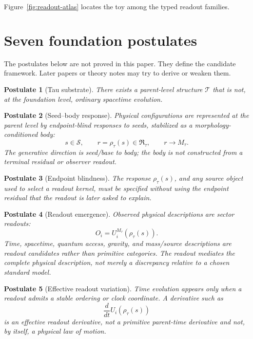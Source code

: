 \documentclass[11pt]{article}
\newtheorem{postulate}{Postulate}
\newcommand{\T}{\mathcal T}
\newcommand{\Ssrc}{\mathcal S}
\newcommand{\RTspace}{\mathfrak R_{\tau}}
\newcommand{\Rmap}{\rho_{\tau}}
\newcommand{\Mta}{M_{\tau}}
\begin{document}
Figure~\ref{fig:readout-atlas} locates the toy among the typed readout families.

\section{Seven foundation postulates}

The postulates below are not proved in this paper.  They define the candidate
framework.  Later papers or theory notes may try to derive or weaken them.

\begin{postulate}[Tau substrate]
There exists a parent-level structure \(\T\) that is not, at the foundation
level, ordinary spacetime evolution.
\end{postulate}

\begin{postulate}[Seed--body response]
Physical configurations are represented at the parent level by endpoint-blind
responses to seeds, stabilized as a morphology-conditioned body:
\[
  s \in \Ssrc, \qquad r=\Rmap(s)\in \RTspace,
  \qquad r\longrightarrow\Mta.
\]
The generative direction is seed/base to body; the body is not constructed
from a terminal residual or observer readout.
\end{postulate}

\begin{postulate}[Endpoint blindness]
The response \(\Rmap(s)\), and any source object used to select a readout
kernel, must be specified without using the endpoint residual that the readout
is later asked to explain.
\end{postulate}

\begin{postulate}[Readout emergence]
Observed physical descriptions are sector readouts:
\[
  O_i = U_i^{\Mta}(\Rmap(s)).
\]
Time, spacetime, quantum access, gravity, and mass/source descriptions are
readout candidates rather than primitive categories.  The readout mediates
the complete physical description, not merely a discrepancy relative to a
chosen standard model.
\end{postulate}

\begin{postulate}[Effective readout variation]
Time evolution appears only when a readout admits a stable ordering or clock
coordinate.  A derivative such as
\[
  \frac{d}{dt} U_i(\Rmap(s))
\]
is an effective readout derivative, not a primitive parent-time derivative and
not, by itself, a physical law of motion.
\end{postulate}
\end{document}
